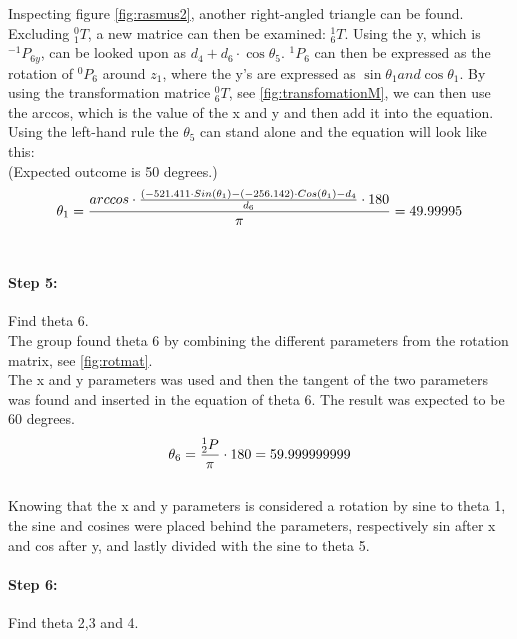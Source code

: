 Inspecting figure \ref{fig:rasmus2}, another right-angled triangle can be found.\\
Excluding $_1^0T$, a new matrice can then be examined: $_6^1T$. 
Using the y, which is $^{-1}P_{6y}$, can be looked upon as $d_4+d_6\cdot\cos{\theta_5}$.
$^1P_6$ can then be expressed as the rotation of $^0P_6$ around $z_1$, where the y's are expressed as $\sin{\theta_1}and\cos{\theta_1}$.
By using the transformation matrice $_6^0T$, see \ref{fig:transfomationM}, we can then use the arccos, which is the value of the x and y and then add it into the equation.\\
Using the left-hand rule the $\theta_5$ can stand alone and the equation will look like this:\\
(Expected outcome is 50 degrees.)\\
\begin{equation}
\centering
\large\theta_1 =\frac{arccos\cdot\frac{(-521.411\cdot Sin(\theta_1)-(-256.142)\cdot Cos(\theta_1)-d_4}{d_6}\cdot 180}{\pi}=49.99995
\end{equation}\\


\paragraph{Step 5:} Find theta 6.\\

The group found theta 6 by combining the different parameters from the rotation matrix, see \ref{fig:rotmat}.\\
The x and y parameters was used and then the tangent of the two parameters was found and inserted in the equation of theta 6.
The result was expected to be 60 degrees.\\

\begin{equation}
\centering
\theta_6 = \frac{^1_2 P}{\pi} \cdot 180 = 59.999999999
\label{}
\end{equation}\\

Knowing that the x and y parameters is considered a rotation by sine to theta 1, the sine and cosines were placed behind the parameters, respectively sin after x and cos after y, and lastly divided with the sine to theta 5.

\paragraph{Step 6:} Find theta 2,3 and 4.\\

